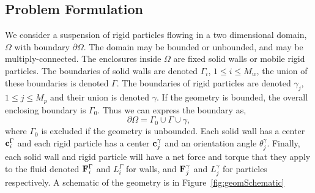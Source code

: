 \documentclass[preprint, 10pt]{elsarticle}
\begin{document}
\subsection{Problem Formulation}

We consider a suspension of rigid particles flowing in a two dimensional
domain, $\Omega$ with boundary $\partial\Omega$.  The domain may be bounded or
unbounded, and may be multiply-connected. The enclosures inside $\Omega$ are fixed solid walls or mobile rigid particles. The boundaries of solid walls are denoted $\Gamma_i$, $1\leq i \leq M_w$, the union of these boundaries is denoted $\Gamma$.  The boundaries of rigid particles are denoted $\gamma_j$, $1\leq j\leq M_p$ and their union is denoted $\gamma$. If the geometry is
bounded, the overall enclosing boundary is $\Gamma_0$.  Thus we can express the boundary as,
\begin{equation} \partial\Omega =\Gamma_0\cup \Gamma \cup \gamma,\end{equation}
where $\Gamma_0$ is excluded if the geometry is unbounded. Each solid wall has a center ${\mathbf{c}}^\Gamma_i$ and each rigid particle has a center ${\mathbf{c}}^\gamma_j$ and an orientation angle $\theta^\gamma_j$.  Finally, each solid wall and rigid
particle will have a net force and torque that they apply to the fluid denoted ${\mathbf{F}}^\Gamma_i$ and $L^\Gamma_i$ for walls, and ${\mathbf{F}}^\gamma_j$ and $L^\gamma_j$ for particles respectively.  A schematic
of the geometry is in Figure~\ref{fig:geomSchematic}

%
\end{document}
